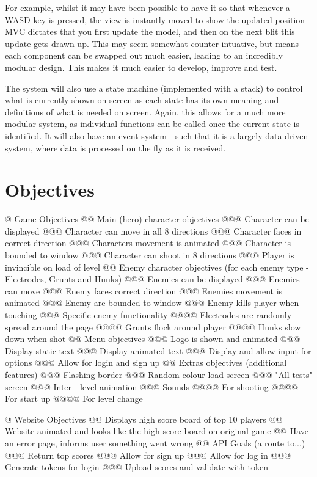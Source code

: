 For example, whilst it may have been possible to have it so that whenever a WASD key is pressed, the view is instantly moved to show the updated position - MVC dictates that you first update the model, and then on the next blit this update gets drawn up. This may seem somewhat counter intuative, but means each component can be swapped out much easier, leading to an incredibly modular design. This makes it much easier to develop, improve and test.

The system will also use a state machine (implemented with a stack) to control what is currently shown on screen as each state has its own meaning and definitions of what is needed on screen. Again, this allows for a much more modular system, as individual functions can be called once the current state is identified. It will also have an event system - such that it is a largely data driven system, where data is processed on the fly as it is received.

\section{Objectives}
\begin{easylist}[articletoc]
@ Game Objectives
@@ Main (hero) character objectives
@@@ Character can be displayed
@@@ Character can move in all 8 directions
@@@ Character faces in correct direction
@@@ Characters movement is animated
@@@ Character is bounded to window
@@@ Character can shoot in 8 directions
@@@ Player is invincible on load of level
@@ Enemy character objectives (for each enemy type - Electrodes, Grunts and Hunks)
@@@ Enemies can be displayed
@@@ Enemies can move
@@@ Enemy faces correct direction
@@@ Enemies movement is animated
@@@ Enemy are bounded to window
@@@ Enemy kills player when touching
@@@ Specific enemy functionality
@@@@ Electrodes are randomly spread around the page
@@@@ Grunts flock around player
@@@@ Hunks slow down when shot
@@ Menu objectives
@@@ Logo is shown and animated
@@@ Display static text
@@@ Display animated text
@@@ Display and allow input for options
@@@ Allow for login and sign up
@@ Extras objectives (additional features) 
@@@ Flashing border
@@@ Random colour load screen
@@@ "All tests" screen
@@@ Inter---level animation
@@@ Sounds
@@@@ For shooting
@@@@ For start up
@@@@ For level change

@ Website Objectives
@@ Displays high score board of top 10 players
@@ Website animated and looks like the high score board on original game
@@ Have an error page, informs user something went wrong
@@ API Goals (a route to...)
@@@ Return top scores
@@@ Allow for sign up
@@@ Allow for log in
@@@ Generate tokens for login
@@@ Upload scores and validate with token
\end{easylist}